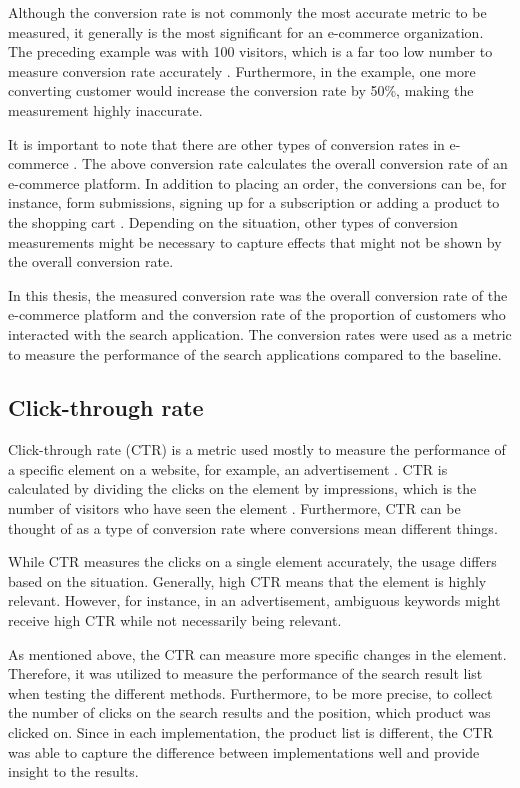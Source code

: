 Although the conversion rate is not commonly the most accurate metric to be measured, 
it generally is the most significant for an e-commerce organization.
The preceding example was with 100 visitors, which is a far too low number to measure conversion rate accurately \cite{conversionRateWhat}.
Furthermore, in the example, one more converting customer would increase the conversion rate by 50\%,
making the measurement highly inaccurate.


It is important to note that there are other types of conversion rates in e-commerce \cite{conversionRate}.
The above conversion rate calculates the overall conversion rate of an e-commerce platform.
In addition to placing an order, the conversions can be, for instance, form submissions, signing up for a subscription 
or adding a product to the shopping cart \cite{conversionRateWhat}.
Depending on the situation, other types of conversion measurements might be necessary 
to capture effects that might not be shown by the overall conversion rate.


In this thesis, the measured conversion rate was the overall conversion rate of the e-commerce platform and 
the conversion rate of the proportion of customers who interacted with the search application.
The conversion rates were used as a metric to measure the performance of the search applications
compared to the baseline.


\subsection{Click-through rate}
\label{ss:ctr}

Click-through rate (CTR) is a metric used mostly to measure the performance of a specific element on a website, 
for example, an advertisement \cite{ctrWhat}. 
CTR is calculated by dividing the clicks on the element by impressions, 
which is the number of visitors who have seen the element \cite{ctrWhat}.
Furthermore, CTR can be thought of as a type of conversion rate where conversions mean different things.


While CTR measures the clicks on a single element accurately, the usage differs based on the situation.
Generally, high CTR means that the element is highly relevant. 
However, for instance, in an advertisement, ambiguous keywords might receive high CTR while not necessarily being relevant.
\cite{ctrWhat}

As mentioned above, the CTR can measure more specific changes in the element. 
Therefore, it was utilized to measure the performance of the search result list when testing the different methods.
Furthermore, to be more precise, to collect the number of clicks on the search results and the position, which product
was clicked on.
Since in each implementation, the product list is different, the CTR was able to capture the 
difference between implementations well and provide insight to the results.

